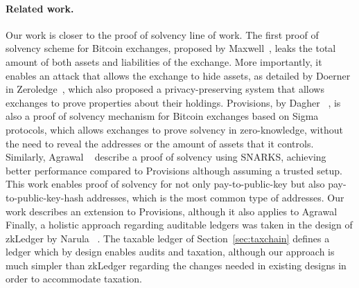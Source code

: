 \paragraph{Related work.}\label{sec:related}

Our work is closer to the proof of solvency line of work. The first proof of
solvency scheme for Bitcoin exchanges, proposed by
Maxwell~\cite{wilcox2014proving}, leaks the total amount of both assets and
liabilities of the exchange. More importantly, it enables an attack that allows
the exchange to hide assets, as detailed by Doerner \etal in
Zeroledge~\cite{doernerzeroledge}, which also proposed a privacy-preserving
system that allows exchanges to prove properties about their holdings.
Provisions, by Dagher \etal~\cite{CCS:DBBCB15}, is also a proof of solvency
mechanism for Bitcoin exchanges based on Sigma protocols, which allows
exchanges to prove solvency in zero-knowledge, \ie without the need to reveal
the addresses or the amount of assets that it controls.  Similarly, Agrawal
\etal~\cite{C:AgrGanMoh18} describe a proof of solvency using SNARKS, achieving
better performance compared to Provisions although assuming a trusted setup.
This work enables proof of solvency for not only pay-to-public-key but also
pay-to-public-key-hash addresses, which is the most common type of addresses.
Our work describes an extension to Provisions, although it also applies to
Agrawal \etal Finally, a holistic approach regarding auditable ledgers was
taken in the design of zkLedger by Narula \etal~\cite{EPRINT:NarVasVir18}. The
taxable ledger of Section~\ref{sec:taxchain} defines a ledger which by design
enables audits and taxation, although our approach is much simpler than
zkLedger regarding the changes needed in existing designs in order to
accommodate taxation.
